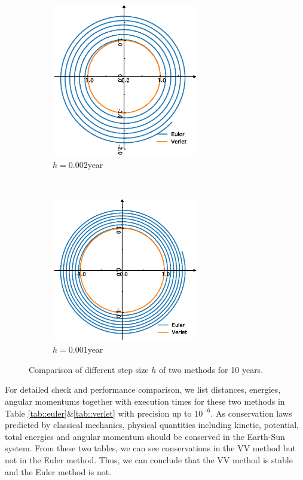 \begin{figure}[tb]
\begin{subfigure}[tb]{0.5\textwidth}
		\includegraphics[width=0.7\textwidth]{Earth5000.eps}		\caption{$h = 0.002$year}
		\label{fig:earth5000}
	\end{subfigure}
~
	\begin{subfigure}[tb]{0.5\textwidth}
		\centering
		\includegraphics[width=0.7\textwidth]{Earth10000.eps}		\caption{$h = 0.001$year}
		\label{fig:earth10000}
	\end{subfigure}
	\caption{Comparison of different step size $h$ of two methods for 10 years. }
	\label{fig::earth}
\end{figure}

 For detailed check and performance comparison, we list distances, energies, angular momentums together with execution times for these two methods in Table \ref{tab::euler}\&\ref{tab::verlet} with precision up to $10^{-6}$.
 As conservation laws predicted by classical mechanics, physical quantities including kinetic, potential, total energies and angular momentum should be conserved in the Earth-Sun system. 
 From these two tables, we can see conservations in the VV method but not in the Euler method. Thus, we can conclude that the VV method is stable and the Euler method is not.
 

